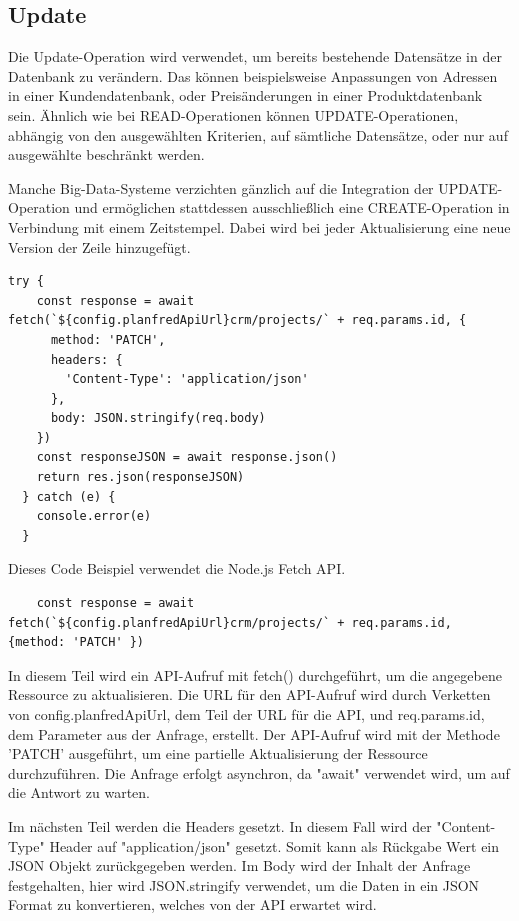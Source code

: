 \subsection{Update}

Die Update-Operation wird verwendet, um bereits bestehende Datensätze in der Datenbank zu verändern. Das können beispielsweise Anpassungen von Adressen in einer Kundendatenbank, oder Preisänderungen in einer Produktdatenbank sein. Ähnlich wie bei READ-Operationen können UPDATE-Operationen, abhängig von den ausgewählten Kriterien, auf sämtliche Datensätze, oder nur auf ausgewählte beschränkt werden.

Manche Big-Data-Systeme verzichten gänzlich auf die Integration der UPDATE-Operation und ermöglichen stattdessen ausschließlich eine CREATE-Operation in Verbindung mit einem Zeitstempel. Dabei wird bei jeder Aktualisierung eine neue Version der Zeile hinzugefügt.

\begin{lstlisting}[caption=Update-Operation]
try {
    const response = await fetch(`${config.planfredApiUrl}crm/projects/` + req.params.id, {
      method: 'PATCH',
      headers: {
        'Content-Type': 'application/json'
      },
      body: JSON.stringify(req.body)
    })
    const responseJSON = await response.json()
    return res.json(responseJSON)
  } catch (e) {
    console.error(e)
  }
\end{lstlisting}
\newpage
Dieses Code Beispiel verwendet die Node.js Fetch API. 

\begin{lstlisting}
    const response = await fetch(`${config.planfredApiUrl}crm/projects/` + req.params.id, {method: 'PATCH' })
\end{lstlisting}

In diesem Teil wird ein API-Aufruf mit fetch() durchgeführt, um die angegebene Ressource zu aktualisieren. Die URL für den API-Aufruf wird durch Verketten von config.planfredApiUrl, dem Teil der URL für die API, und req.params.id, dem Parameter aus der Anfrage, erstellt. Der API-Aufruf wird mit der Methode 'PATCH' ausgeführt, um eine partielle Aktualisierung der Ressource durchzuführen. Die Anfrage erfolgt asynchron, da "await" verwendet wird, um auf die Antwort zu warten.\newline

Im nächsten Teil werden die Headers gesetzt. In diesem Fall wird der "Content-Type" Header auf "application/json" gesetzt. Somit kann als Rückgabe Wert ein JSON Objekt zurückgegeben werden. Im Body wird der Inhalt der Anfrage festgehalten, hier wird JSON.stringify verwendet, um die Daten in ein JSON Format zu konvertieren, welches von der API erwartet wird.

